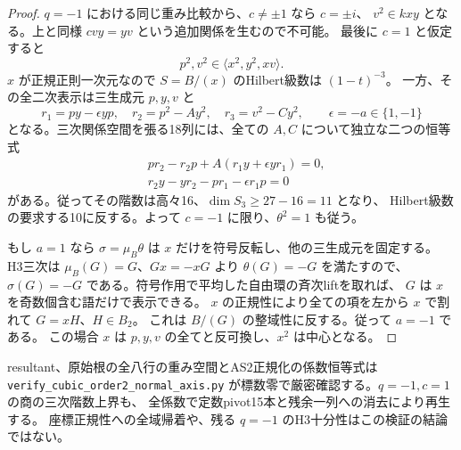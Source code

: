 \begin{proof}
$q=-1$ における同じ重み比較から、$c\ne\pm1$ なら $c=\pm i$、
$v^2\in kxy$ となる。上と同様 $cvy=yv$ という追加関係を生むので不可能。
最後に $c=1$ と仮定すると
\[
 p^2,v^2\in\langle x^2,y^2,xv\rangle.
\]
$x$ が正規正則一次元なので $S=B/(x)$ のHilbert級数は $(1-t)^{-3}$。
一方、その全二次表示は三生成元 $p,y,v$ と
\[
 r_1=py-\epsilon yp,\quad r_2=p^2-Ay^2,\quad r_3=v^2-Cy^2,
 \qquad\epsilon=-a\in\{1,-1\}
\]
となる。三次関係空間を張る18列には、全ての $A,C$ について独立な二つの恒等式
\begin{align*}
 &p r_2-r_2p+A(r_1y+\epsilon yr_1)=0,\\
 &r_2y-yr_2-pr_1-\epsilon r_1p=0
\end{align*}
がある。従ってその階数は高々16、$\dim S_3\ge27-16=11$ となり、
Hilbert級数の要求する10に反する。よって $c=-1$ に限り、$\theta^2=1$ も従う。

もし $a=1$ なら $\sigma=\mu_B\theta$ は $x$ だけを符号反転し、他の三生成元を固定する。
H3三次は $\mu_B(G)=G$、$Gx=-xG$ より $\theta(G)=-G$ を満たすので、
$\sigma(G)=-G$ である。符号作用で平均した自由環の斉次liftを取れば、
$G$ は $x$ を奇数個含む語だけで表示できる。
$x$ の正規性により全ての項を左から $x$ で割れて $G=xH$、$H\in B_2$。
これは $B/(G)$ の整域性に反する。従って $a=-1$ である。
この場合 $x$ は $p,y,v$ の全てと反可換し、$x^2$ は中心となる。
\end{proof}
resultant、原始根の全八行の重み空間とAS2正規化の係数恒等式は
\texttt{verify\_\allowbreak{}cubic\_\allowbreak{}order2\_\allowbreak{}normal\_\allowbreak{}axis.py}
が標数零で厳密確認する。$q=-1,c=1$ の商の三次階数上界も、
全係数で定数pivot15本と残余一列への消去により再生する。
座標正規性への全域帰着や、残る $q=-1$ のH3十分性はこの検証の結論ではない。

